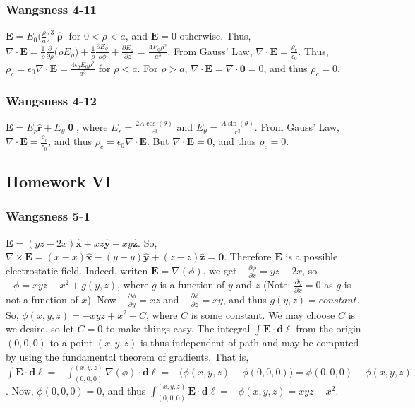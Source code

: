 \documentclass{article}
\theoremstyle{mystyle}
\begin{document}
\subsubsection{Wangsness 4-11}
$\mathbf{E} = E_0 \big(\frac{\rho}{a}\big)^3 \hat{\boldsymbol{\uprho}}$ for $0 < \rho < a$, and $\mathbf{E} = 0$ otherwise. Thus, $\nabla \cdot \mathbf{E} = \frac{1}{\rho} \frac{\partial}{\partial \rho}\big(\rho E_{\rho}\big) + \frac{1}{\rho} \frac{\partial E_{\phi}}{\partial \phi} + \frac{\partial E_z}{\partial z}$ = $\frac{4E_0 \rho^2}{a^3}$. From Gauss' Law, $\nabla \cdot \mathbf{E} = \frac{\rho_c}{\epsilon_0}$. Thus, $\rho_c = \epsilon_0 \nabla \cdot \mathbf{E} = \frac{4\epsilon_0 E_0 \rho^2}{a^3}$ for $\rho<a$. For $\rho>a$, $\nabla \cdot \mathbf{E} = \nabla \cdot \mathbf{0} = 0$, and thus $\rho_c = 0$.
\subsubsection{Wangsness 4-12}
$\mathbf{E} = E_r \hat{\mathbf{r}}+E_{\theta} \hat{\boldsymbol{\uptheta}}$, where $E_r = \frac{2A\cos(\theta)}{r^3}$ and $E_{\theta} = \frac{A\sin(\theta)}{r^3}$. From Gauss' Law, $\nabla \cdot \mathbf{E} = \frac{\rho_c}{\epsilon_0}$, and thus $\rho_c = \epsilon_0 \nabla \cdot \mathbf{E}$. But $\nabla \cdot \mathbf{E} = 0$, and thus $\rho_c = 0$.
\subsection{Homework VI}
\subsubsection{Wangsness 5-1}
$\mathbf{E} = (yz-2x)\hat{\mathbf{x}}+xz\hat{\mathbf{y}}+xy\hat{\mathbf{z}}$. So, $\nabla \times \mathbf{E} = (x-x)\hat{\mathbf{x}}-(y-y)\hat{\mathbf{y}}+(z-z)\hat{\mathbf{z}} = \mathbf{0}$. Therefore $\mathbf{E}$ is a possible electrostatic field. Indeed, writen $\mathbf{E} = \nabla(\phi)$, we get $-\frac{\partial \phi}{\partial x} = yz-2x$, so $-\phi = xyz - x^2 + g(y,z)$, where $g$ is a function of $y$ and $z$ (Note: $\frac{\partial g}{\partial x} = 0$ as $g$ is not a function of $x$). Now $-\frac{\partial \phi}{\partial y} = xz$ and $-\frac{\partial \phi}{\partial z} = xy$, and thus $g(y,z) = constant$. So, $\phi(x,y,z) = -xyz+x^2 + C$, where $C$ is some constant. We may choose $C$ is we desire, so let $C=0$ to make things easy. The integral $\int \mathbf{E}\cdot \mathbf{d\ell}$ from the origin $(0,0,0)$ to a point $(x,y,z)$ is thus independent of path and may be computed by using the fundamental theorem of gradients. That is, $\int \mathbf{E}\cdot \mathbf{d\ell} = -\int _{(0,0,0)}^{(x,y,z)} \nabla(\phi)\cdot \mathbf{d\ell} = -\big(\phi(x,y,z) -\phi(0,0,0)\big) = \phi(0,0,0)-\phi(x,y,z)$. Now, $\phi(0,0,0)= 0$, and thus $\int_{(0,0,0)}^{(x,y,z)}\mathbf{E}\cdot \mathbf{d\ell} = -\phi(x,y,z) = xyz-x^2$.
\end{document}
